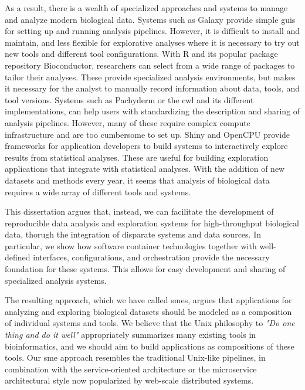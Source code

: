As a result, there is a wealth of specialized approaches and systems to manage
and analyze modern biological data. Systems such as Galaxy\cite{galaxy} provide
simple \glspl{gui} for setting up and running analysis pipelines. However, it is
difficult to install and maintain, and less flexible for explorative analyses
where it is necessary to try out new tools and different tool
configurations.\cite{spjuth2015experiences} With R and its popular package
repository Bioconductor,\cite{bioconductor} researchers can select from a wide
range of packages to tailor their analyses. These provide specialized analysis
environments, but makes it necessary for the analyst to manually record
information about data, tools, and tool versions. Systems such as
Pachyderm\cite{pachyderm} or the \gls{cwl}\cite{commonwl} and its different
implementations, can help users with standardizing the description and sharing
of analysis pipelines.  However, many of these require complex compute
infrastructure and are too cumbersome to set up.  Shiny\cite{shiny} and
OpenCPU\cite{opencpu} provide frameworks for application developers to build
systems to interactively explore results from statistical analyses.  These are
useful for building exploration applications that integrate with statistical
analyses.  With the addition of new datasets and methods every year, it seems
that analysis of biological data requires a wide array of different tools and
systems.

This dissertation argues that, instead, we can facilitate the development of
reproducible data analysis and exploration systems for high-throughput
biological data, thorugh the integration of disparate systems and data sources.
In particular, we show how software container technologies together with
well-defined interfaces, configurations, and orchestration provide the necessary
foundation for these systems. This allows for easy development and sharing of
specialized analysis systems.


The resulting approach, which we have called \glspl{sme}, argues that
applications for analyzing and exploring biological datasets should be modeled
as a composition of individual systems and tools. We believe that the Unix
philosophy to \emph{"Do one thing and do it well"}\cite{raymond2003art}
appropriately summarizes many existing tools in bioinformatics, and we should
aim to build applications as compositions of these tools. Our \gls{sme} approach
resembles the traditional Unix-like pipelines, in combination with the
service-oriented architecture\cite{erl2005service} or the microservice
architectural style now popularized by web-scale distributed
systems.\cite{nadareishvili2016microservice}

